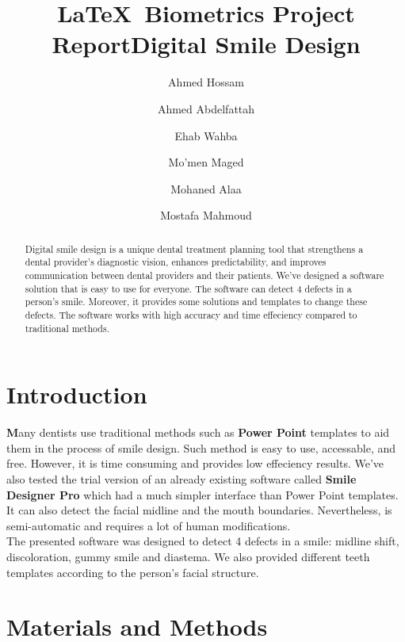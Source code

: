 \documentclass[conference,twocolumn]{IEEEtran}
\begin{document}
\title{\LaTeX\ Biometrics Project Report}

\title{Digital Smile Design}
\author[1]{Ahmed Hossam}
\author[1]{Ahmed Abdelfattah }
\author[1]{Ehab Wahba }
\author[1]{Mo'men Maged}
\author[1]{Mohaned Alaa }
\author[1]{Mostafa Mahmoud}


\renewcommand\Authands{ and }

\maketitle
\pagestyle{plain}

\begin{abstract}
    Digital smile design is a unique dental treatment planning tool that strengthens a dental provider's diagnostic vision, enhances predictability, and improves communication between dental providers and their patients.
    We've designed a software solution that is easy to use for everyone. The software can detect 4 defects in a person's smile. Moreover, it provides some solutions and templates to change these defects.
    The software works with high accuracy and time effeciency compared to traditional methods.
\end{abstract}
\section{\textbf{Introduction}}
\textbf {M}any dentists use traditional methods such as \textbf{Power Point} templates to aid them in the process of smile design. 
 Such method is easy to use, accessable, and free. However, it is time consuming and provides low effeciency results.
 We've also tested the trial version of an already existing software called \textbf{Smile Designer Pro} which had a much simpler interface than Power Point templates. It can also detect the facial midline and the mouth boundaries.
 Nevertheless, is semi-automatic and requires a lot of human modifications.\\
 The presented software was designed to detect 4 defects in a smile: midline shift, discoloration, gummy smile and diastema.
 We also provided different teeth templates according to the person's facial structure.
 

\section{\textbf{Materials and Methods}}
\end{document}

